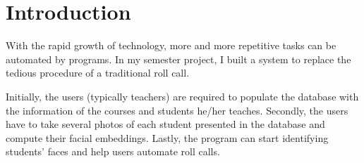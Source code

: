 \section{Introduction}
With the rapid growth of technology, more and more repetitive tasks can be automated by programs.
In my semester project, I built a system to replace the tedious procedure of a traditional roll call.
\newline

Initially, the users (typically teachers) are required to populate the database with the information
of the courses and students he/her teaches. Secondly, the users have to take several photos of each
student presented in the database and compute their facial embeddings. Lastly, the program can start
identifying students' faces and help users automate roll calls.
\newline
